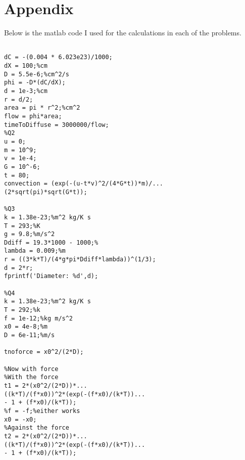 \documentclass[12pt]{article}
\begin{document}
\section{Appendix}
Below is the matlab code I used for the calculations in each of the problems.
\begin{lstlisting}[style=Matlab-editor]
%Q1

dC = -(0.004 * 6.023e23)/1000;
dX = 100;%cm
D = 5.5e-6;%cm^2/s
phi = -D*(dC/dX);
d = 1e-3;%cm
r = d/2;
area = pi * r^2;%cm^2
flow = phi*area;
timeToDiffuse = 3000000/flow;
%Q2
u = 0;
m = 10^9;
v = 1e-4;
G = 10^-6;
t = 80;
convection = (exp(-(u-t*v)^2/(4*G*t))*m)/...
(2*sqrt(pi)*sqrt(G*t));

%Q3
k = 1.38e-23;%m^2 kg/K s
T = 293;%K
g = 9.8;%m/s^2
Ddiff = 19.3*1000 - 1000;%
lambda = 0.009;%m
r = ((3*k*T)/(4*g*pi*Ddiff*lambda))^(1/3);
d = 2*r;
fprintf('Diameter: %d',d);

%Q4
k = 1.38e-23;%m^2 kg/K s
T = 292;%k
f = 1e-12;%kg m/s^2
x0 = 4e-8;%m
D = 6e-11;%m/s

tnoforce = x0^2/(2*D);

%Now with force
%With the force
t1 = 2*(x0^2/(2*D))*...
((k*T)/(f*x0))^2*(exp(-(f*x0)/(k*T))...
- 1 + (f*x0)/(k*T));
%f = -f;%either works
x0 = -x0;
%Against the force
t2 = 2*(x0^2/(2*D))*...
((k*T)/(f*x0))^2*(exp(-(f*x0)/(k*T))...
- 1 + (f*x0)/(k*T));



\end{lstlisting}
\end{document}

